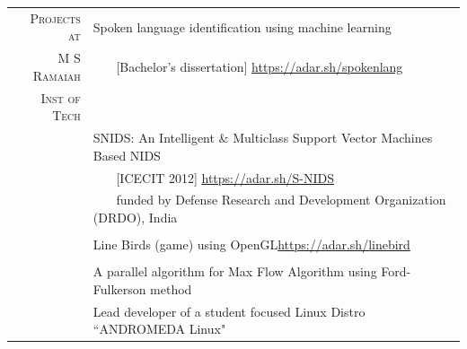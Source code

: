 \documentclass[a4paper,10pt]{article} %
\begin{document}
\begin{tabular}{rp{12cm}}
	\textsc{Projects at} & Spoken language identification using machine learning \\ 
	\textsc{M S Ramaiah} & ~~~ [Bachelor's dissertation] \qquad \qquad \href{https://adar.sh/spokenlang}{https://adar.sh/spokenlang} \\
	\textsc{Inst of Tech} & \\
	& SNIDS: An Intelligent \& Multiclass Support Vector Machines Based NIDS \\ 
	& ~~~ [ICECIT 2012] \qquad \qquad \qquad \qquad \quad \href{https://adar.sh/S-NIDS}{https://adar.sh/S-NIDS} \\
	& ~~~ funded by Defense Research and Development Organization (DRDO), India \\
	& \\
	& Line Birds (game) using OpenGL\qquad \href{https://adar.sh/linebird}{https://adar.sh/linebird}\\
	& \\
	& A parallel algorithm for Max Flow Algorithm using Ford-Fulkerson method \\
	& Lead developer of a student focused Linux Distro ``ANDROMEDA Linux" \\
\end{tabular}

\iffalse
\end{document}
